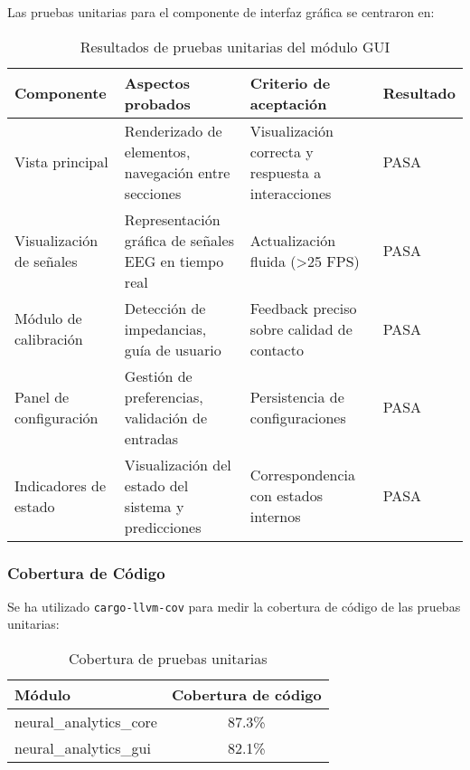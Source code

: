 Las pruebas unitarias para el componente de interfaz gráfica se centraron en:

\begin{table}[ht]
    \centering
    \begin{tabular}{|p{2.5cm}|p{5cm}|p{3cm}|p{2cm}|}
        \hline
        \textbf{Componente} & \textbf{Aspectos probados} & \textbf{Criterio de aceptación} & \textbf{Resultado} \\
        \hline
        Vista principal & Renderizado de elementos, navegación entre secciones & Visualización correcta y respuesta a interacciones & PASA \\
        \hline
        Visualización de señales & Representación gráfica de señales EEG en tiempo real & Actualización fluida (>25 FPS) & PASA \\
        \hline
        Módulo de calibración & Detección de impedancias, guía de usuario & Feedback preciso sobre calidad de contacto & PASA \\
        \hline
        Panel de configuración & Gestión de preferencias, validación de entradas & Persistencia de configuraciones & PASA \\
        \hline
        Indicadores de estado & Visualización del estado del sistema y predicciones & Correspondencia con estados internos & PASA \\
        \hline
    \end{tabular}
    \caption{Resultados de pruebas unitarias del módulo GUI}
    \label{tab:unit_tests_gui}
\end{table}

\newpage
\subsubsection{Cobertura de Código}

Se ha utilizado \texttt{cargo-llvm-cov} para medir la cobertura de código de las pruebas unitarias:

\begin{table}[ht]
    \centering
    \begin{tabular}{|l|c|}
        \hline
        \textbf{Módulo} & \textbf{Cobertura de código} \\
        \hline
        neural\_analytics\_core & 87.3\% \\
        \hline
        neural\_analytics\_gui & 82.1\% \\
        \hline
    \end{tabular}
    \caption{Cobertura de pruebas unitarias}
    \label{tab:code_coverage}
\end{table}


